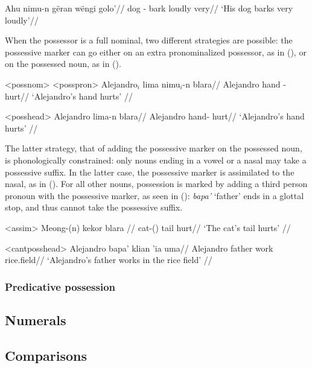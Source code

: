 \documentclass[12pt]{article}
\begin{document}
\begingl %
\gla Ahu nimu-n gëran wëngi golo'//
\glb dog \Third{}\Sg{}-\Poss{} bark loudly very//
\glft `His dog barks very loudly'// 
\endgl
\xe

When the possessor is a full nominal, two different strategies are possible: the possessive marker can go either on an extra pronominalized possessor, as in (), or on the possessed noun, as in ().

\pex<possnom> %
\a<posspron> %
\begingl %
\gla Alejandro$_i$ lima nimu$_i$-n blara//
\glb Alejandro hand \Third{}\Sg{}-\Poss{} hurt//
\glft `Alejandro's hand hurts' // 
\endgl

\a<posshead> %
\begingl %
\gla Alejandro lima-n blara//
\glb Alejandro hand-\Poss{} hurt//
\glft `Alejandro's hand hurts' // 
\endgl
\xe

The latter strategy, that of adding the possessive marker on the possessed noun, is phonologically constrained: only  nouns ending in a vowel or a nasal may take a possessive suffix. In the latter case, the possessive marker is assimilated to the nasal, as in (). For all other nouns, possession is marked by adding a third person pronoun with the possessive marker, as seen in (): \textit{bapa'} `father' ends in a glottal stop, and thus cannot take the possessive suffix.

\ex<assim> %
\begingl %
\gla Meong-(n) kekor blara //
\glb cat-(\Poss{}) tail hurt//
\glft `The cat's tail hurts' // 
\endgl %
\xe

\ex<cantposshead>
\begingl %
\gla Alejandro bapa' klian 'ia uma//
\glb Alejandro father work \Loc{} rice.field//
\glft `Alejandro's father works in the rice field' // 
\endgl
\xe %

\subsubsection{Predicative possession}

\subsection{Numerals}

\subsection{Comparisons}
\end{document}
